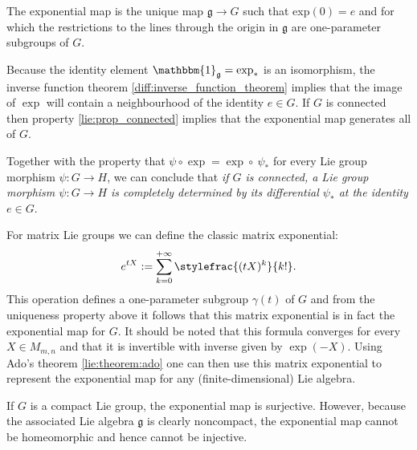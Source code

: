     \begin{property}[Uniqueness]
        The exponential map is the unique map $\mathfrak{g}\rightarrow G$ such that exp$(0) = e$ and for which the restrictions to the lines through the origin in $\mathfrak{g}$ are one-parameter subgroups of $G$.
    \end{property}
    \begin{result}\label{lie:exp_result}
        Because the identity element $\mathbbm{1}_\mathfrak{g}=\exp_\ast$ is an isomorphism, the inverse function theorem \ref{diff:inverse_function_theorem} implies that the image of $\exp$ will contain a neighbourhood of the identity $e\in G$. If $G$ is connected then property \ref{lie:prop_connected} implies that the exponential map generates all of $G$.

        Together with the property that $\psi\circ\exp = \exp\circ\ \psi_\ast$ for every Lie group morphism $\psi:G\rightarrow H$, we can conclude that \textit{if $G$ is connected, a Lie group morphism $\psi:G\rightarrow H$ is completely determined by its differential $\psi_\ast$ at the identity $e\in G$}.
    \end{result}

    \begin{example}
        For matrix Lie groups we can define the classic matrix exponential:
        \begin{gather}
            e^{tX} := \sum_{k=0}^{+\infty}\stylefrac{(tX)^k}{k!}.
        \end{gather}
        This operation defines a one-parameter subgroup $\gamma(t)$ of $G$ and from the uniqueness property above it follows that this matrix exponential is in fact the exponential map for $G$. It should be noted that this formula converges for every $X\in M_{m,n}$ and that it is invertible with inverse given by $\exp(-X)$. Using Ado's theorem \ref{lie:theorem:ado} one can then use this matrix exponential to represent the exponential map for any (finite-dimensional) Lie algebra.
    \end{example}

    \begin{remark}
        If $G$ is a compact Lie group, the exponential map is surjective. However, because the associated Lie algebra $\mathfrak{g}$ is clearly noncompact, the exponential map cannot be homeomorphic and hence cannot be injective.
    \end{remark}

